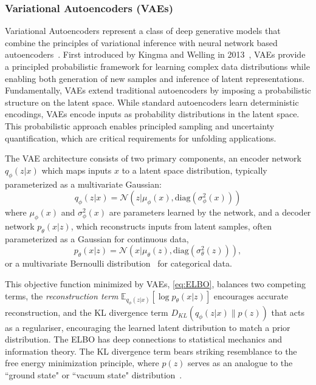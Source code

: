     \subsubsection{Variational Autoencoders (VAEs)}
        Variational Autoencoders represent a class of deep generative models that combine the principles of variational inference with neural network based autoencoders~\cite{Bank2023Autoencoders}.
        First introduced by Kingma and Welling in 2013~\cite{Kingma2013Auto-EncodingBayes}, VAEs provide a principled probabilistic framework for learning complex data distributions while enabling both generation of new samples and inference of latent representations.
        Fundamentally, VAEs extend traditional autoencoders by imposing a probabilistic structure on the latent space.
        While standard autoencoders learn deterministic encodings, VAEs encode inputs as probability distributions in the latent space.
        This probabilistic approach enables principled sampling and uncertainty quantification, which are critical requirements for unfolding applications.

        The VAE architecture consists of two primary components, an encoder network \(q_{\phi}(z|x)\) which maps inputs \(x\) to a latent space distribution, typically parameterized as a multivariate Gaussian:
        \begin{equation}
        q_{\phi}(z|x) = \mathcal{N}(z|\mu_{\phi}(x), \text{diag}(\sigma^2_{\phi}(x)))
        \end{equation}
        where \(\mu_{\phi}(x)\) and \(\sigma^2_{\phi}(x)\) are parameters learned by the network, and a  decoder network \(p_{\theta}(x|z)\), which reconstructs inputs from latent samples, often parameterized as a Gaussian for continuous data,
        \begin{equation}
            p_{\theta}(x|z) = \mathcal{N}(x|\mu_{\theta}(z), \text{diag}(\sigma^2_{\theta}(z))),
        \end{equation}
        or a multivariate Bernoulli distribution~\cite{Fajtl2020LatentAutoencoder} for categorical data.

        This objective function minimized by VAEs, \cref{eq:ELBO}, balances two competing terms, the \emph{reconstruction term} \(\mathbb{E}_{q_{\phi}(z|x)}[\log p_{\theta}(x|z)]\) encourages accurate reconstruction, and the KL divergence term \(D_{KL}(q_{\phi}(z|x) \| p(z))\) that acts as a regulariser, encouraging the learned latent distribution to match a prior distribution.
        The ELBO has deep connections to statistical mechanics and information theory.
        The KL divergence term bears striking resemblance to the free energy minimization principle, where \(p(z)\) serves as an analogue to the ``ground state" or ``vacuum state" distribution~\cite{bilionis_free_2012}.

